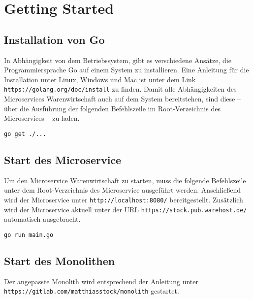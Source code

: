 \section{Getting Started}
\label{sec: Getting Started}

\subsection{Installation von Go}
In Abhängigkeit von dem Betriebssystem, gibt es verschiedene Ansätze, die Programmiersprache Go auf einem System zu installieren. Eine Anleitung für die Installation unter Linux, Windows und Mac ist unter dem Link \texttt{https://golang.org/doc/install} zu finden. Damit alle Abhängigkeiten des Microservices Warenwirtschaft auch auf dem System bereitstehen, sind diese -- über die Ausführung der folgenden Befehlszeile im Root-Verzeichnis des Microservices -- zu laden.
\begin{lstlisting}[caption=Laden der Abhängigkeiten]
go get ./...
\end{lstlisting}

\subsection{Start des Microservice}
Um den Microservice Warenwirtschaft zu starten, muss die folgende Befehlszeile unter dem Root-Verzeichnis des Microservice ausgeführt werden. Anschließend wird der Microservice unter \texttt{http://localhost:8080/} bereitgestellt.  Zusätzlich wird der Microservice aktuell unter der URL \texttt{https://stock.pub.warehost.de/} automatisch ausgebracht.
\begin{lstlisting}[caption=Start des Go-Microservice]
go run main.go
\end{lstlisting}

\subsection{Start des Monolithen}
Der angepasste Monolith wird entsprechend der Anleitung unter \linebreak \texttt{https://gitlab.com/matthiasstock/monolith} gestartet. 